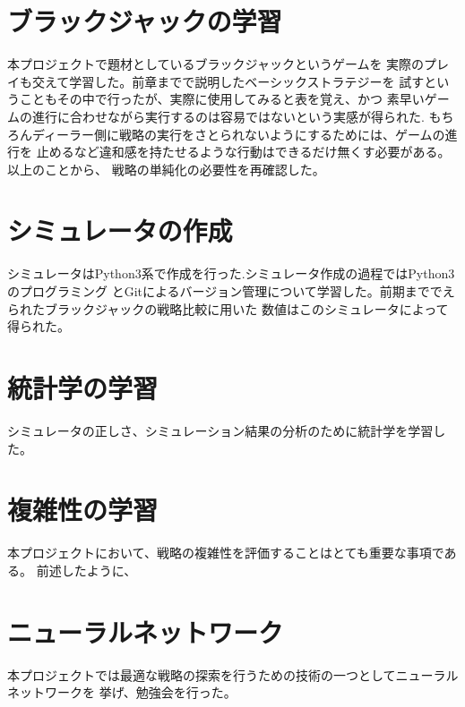 \section{ブラックジャックの学習}
本プロジェクトで題材としているブラックジャックというゲームを
実際のプレイも交えて学習した。前章までで説明したベーシックストラテジーを
試すということもその中で行ったが、実際に使用してみると表を覚え、かつ
素早いゲームの進行に合わせながら実行するのは容易ではないという実感が得られた.
もちろんディーラー側に戦略の実行をさとられないようにするためには、ゲームの進行を
止めるなど違和感を持たせるような行動はできるだけ無くす必要がある。以上のことから、
戦略の単純化の必要性を再確認した。

\section{シミュレータの作成}
シミュレータはPython3系で作成を行った.シミュレータ作成の過程ではPython3のプログラミング
とGitによるバージョン管理について学習した。前期まででえられたブラックジャックの戦略比較に用いた
数値はこのシミュレータによって得られた。

\section{統計学の学習}
シミュレータの正しさ、シミュレーション結果の分析のために統計学を学習した。

\section{複雑性の学習}
本プロジェクトにおいて、戦略の複雑性を評価することはとても重要な事項である。
前述したように、


\section{ニューラルネットワーク}
本プロジェクトでは最適な戦略の探索を行うための技術の一つとしてニューラルネットワークを
挙げ、勉強会を行った。
